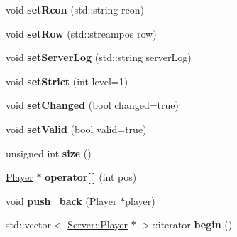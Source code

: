 \begin{DoxyCompactItemize}
\item 
\hypertarget{class_server_a19a8da3f3841c04cf20ade236f7895e2}{
void {\bfseries setRcon} (std::string rcon)}
\label{class_server_a19a8da3f3841c04cf20ade236f7895e2}

\item 
\hypertarget{class_server_abfc5509fcd3e6757bfd5c0f2e84ef125}{
void {\bfseries setRow} (std::streampos row)}
\label{class_server_abfc5509fcd3e6757bfd5c0f2e84ef125}

\item 
\hypertarget{class_server_a243ca865a3fc2d923031b0c0536924db}{
void {\bfseries setServerLog} (std::string serverLog)}
\label{class_server_a243ca865a3fc2d923031b0c0536924db}

\item 
\hypertarget{class_server_aef896c1a27902205d3e5fb949c004e34}{
void {\bfseries setStrict} (int level=1)}
\label{class_server_aef896c1a27902205d3e5fb949c004e34}

\item 
\hypertarget{class_server_aa0cb0bac191b1f04ffe6dac53ffb7147}{
void {\bfseries setChanged} (bool changed=true)}
\label{class_server_aa0cb0bac191b1f04ffe6dac53ffb7147}

\item 
\hypertarget{class_server_a140bf4bae6b4e7ed7cbd112bc02043f5}{
void {\bfseries setValid} (bool valid=true)}
\label{class_server_a140bf4bae6b4e7ed7cbd112bc02043f5}

\item 
\hypertarget{class_server_ae3317b1ec789ee7a9de112d56ba51b0f}{
unsigned int {\bfseries size} ()}
\label{class_server_ae3317b1ec789ee7a9de112d56ba51b0f}

\item 
\hypertarget{class_server_abbbfa2a8a7218f53c514a84e3922ec96}{
\hyperlink{class_server_1_1_player}{Player} $\ast$ {\bfseries operator\mbox{[}$\,$\mbox{]}} (int pos)}
\label{class_server_abbbfa2a8a7218f53c514a84e3922ec96}

\item 
\hypertarget{class_server_aa509981b8d591391a729a0ab6007b734}{
void {\bfseries push\_\-back} (\hyperlink{class_server_1_1_player}{Player} $\ast$player)}
\label{class_server_aa509981b8d591391a729a0ab6007b734}

\item 
\hypertarget{class_server_a425806c3b7891857baed930dcc31ded7}{
std::vector$<$ \hyperlink{class_server_1_1_player}{Server::Player} $\ast$ $>$::iterator {\bfseries begin} ()}
\label{class_server_a425806c3b7891857baed930dcc31ded7}


\end{DoxyCompactItemize}
